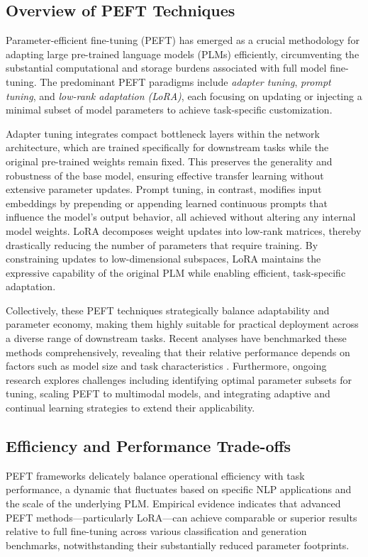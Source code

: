 \documentclass[sigconf]{acmart}
\begin{document}
\subsection{Overview of PEFT Techniques}

Parameter-efficient fine-tuning (PEFT) has emerged as a crucial methodology for adapting large pre-trained language models (PLMs) efficiently, circumventing the substantial computational and storage burdens associated with full model fine-tuning. The predominant PEFT paradigms include \textit{adapter tuning}, \textit{prompt tuning}, and \textit{low-rank adaptation (LoRA)}, each focusing on updating or injecting a minimal subset of model parameters to achieve task-specific customization.

Adapter tuning integrates compact bottleneck layers within the network architecture, which are trained specifically for downstream tasks while the original pre-trained weights remain fixed. This preserves the generality and robustness of the base model, ensuring effective transfer learning without extensive parameter updates. Prompt tuning, in contrast, modifies input embeddings by prepending or appending learned continuous prompts that influence the model’s output behavior, all achieved without altering any internal model weights. LoRA decomposes weight updates into low-rank matrices, thereby drastically reducing the number of parameters that require training. By constraining updates to low-dimensional subspaces, LoRA maintains the expressive capability of the original PLM while enabling efficient, task-specific adaptation.

Collectively, these PEFT techniques strategically balance adaptability and parameter economy, making them highly suitable for practical deployment across a diverse range of downstream tasks. Recent analyses have benchmarked these methods comprehensively, revealing that their relative performance depends on factors such as model size and task characteristics \cite{ref48}. Furthermore, ongoing research explores challenges including identifying optimal parameter subsets for tuning, scaling PEFT to multimodal models, and integrating adaptive and continual learning strategies to extend their applicability.

\subsection{Efficiency and Performance Trade-offs}

PEFT frameworks delicately balance operational efficiency with task performance, a dynamic that fluctuates based on specific NLP applications and the scale of the underlying PLM. Empirical evidence indicates that advanced PEFT methods—particularly LoRA—can achieve comparable or superior results relative to full fine-tuning across various classification and generation benchmarks, notwithstanding their substantially reduced parameter footprints.
\end{document}
